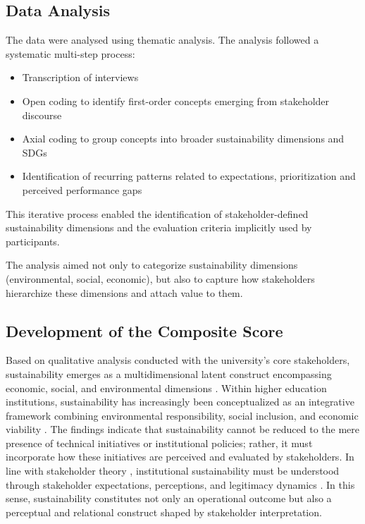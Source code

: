 \documentclass[12pt,a4paper]{article}
\begin{document}
\subsection{Data Analysis}

The data were analysed using thematic analysis. The analysis followed a systematic multi-step process:

\begin{itemize}
    \item Transcription of interviews
    \item Open coding to identify first-order concepts emerging from stakeholder discourse
    \item Axial coding to group concepts into broader sustainability dimensions and SDGs
    \item Identification of recurring patterns related to expectations, prioritization and perceived performance gaps
\end{itemize}

This iterative process enabled the identification of stakeholder-defined sustainability dimensions and the evaluation criteria implicitly used by participants.

The analysis aimed not only to categorize sustainability dimensions (environmental, social, economic), but also to capture how stakeholders hierarchize these dimensions and attach value to them.





\subsection{Development of the Composite Score}

Based on qualitative analysis conducted with the university’s core stakeholders, sustainability emerges as a multidimensional latent construct encompassing economic, social, and environmental dimensions \cite{1,2}. Within higher education institutions, sustainability has increasingly been conceptualized as an integrative framework combining environmental responsibility, social inclusion, and economic viability \cite{3}. The findings indicate that sustainability cannot be reduced to the mere presence of technical initiatives or institutional policies; rather, it must incorporate how these initiatives are perceived and evaluated by stakeholders. In line with stakeholder theory \cite{4}, institutional sustainability must be understood through stakeholder expectations, perceptions, and legitimacy dynamics \cite{5}. In this sense, sustainability constitutes not only an operational outcome but also a perceptual and relational construct shaped by stakeholder interpretation.
\end{document}
